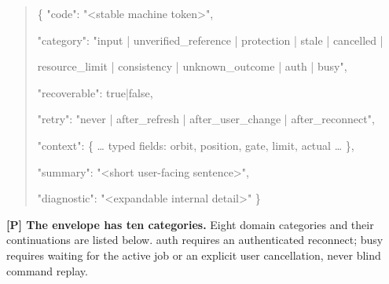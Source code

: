 \documentclass[10pt,a4paper]{article}
\begin{document}
\begin{quote}\small\codefont\raggedright\color{ink}
\{ "code":\allowbreak{} "<stable machi\allowbreak{}ne token>",\allowbreak{}\par
  "category":\allowbreak{} "input | unver\allowbreak{}ified\_\allowbreak{}reference | pro\allowbreak{}tection | stale\allowbreak{} | cancelled |\par
               \allowbreak{}resource\_\allowbreak{}limit | consist\allowbreak{}ency | unknown\_\allowbreak{}outcome | auth \allowbreak{}| busy",\allowbreak{}\par
  "recoverable"\allowbreak{}:\allowbreak{} true|false,\allowbreak{}\par
  "retry":\allowbreak{} "never | after\allowbreak{}\_\allowbreak{}refresh | after\allowbreak{}\_\allowbreak{}user\_\allowbreak{}change | after\_\allowbreak{}reconnect",\allowbreak{}\par
  "context":\allowbreak{} \{ \ldots{} typed fiel\allowbreak{}ds:\allowbreak{} orbit,\allowbreak{} position,\allowbreak{} gate,\allowbreak{} limit,\allowbreak{} actual \ldots{} \},\allowbreak{}\par
  "summary":\allowbreak{} "<short user-\allowbreak{}facing sentence\allowbreak{}>",\allowbreak{}\par
  "diagnostic":\allowbreak{} "<expandable i\allowbreak{}nternal detail>\allowbreak{}" \}\par\end{quote}

\textbf{{[}P{]} The envelope has ten categories.} Eight domain categories and their continuations are listed below. {\codefont auth} requires an authenticated reconnect; {\codefont busy} requires waiting for the active job or an explicit user cancellation, never blind command replay.
\end{document}
